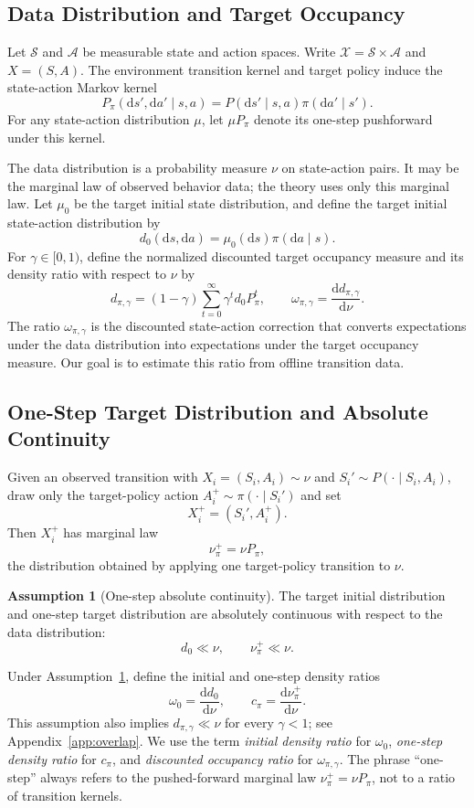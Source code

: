 \documentclass{article}
\newcommand{\sS}{\mathcal{S}}
\newcommand{\sA}{\mathcal{A}}
\newcommand{\sX}{\mathcal{X}}
\newcommand{\1}{\mathbf{1}}
\newcommand{\dd}{\mathrm{d}}
\newcommand{\nup}{\nu_\pi^+}
\newcommand{\cpi}{c_\pi}
\newcommand{\omegazero}{\omega_0}
\newcommand{\omegastar}{\omega_{\pi,\gamma}}
\newcommand{\Ppi}{P_\pi}
\newcommand{\dinit}{d_0}
\theoremstyle{plain}
\theoremstyle{definition}
\newtheorem{assumption}[theorem]{Assumption}
\theoremstyle{remark}
\begin{document}
\subsection{Data Distribution and Target Occupancy}

Let $\sS$ and $\sA$ be measurable state and action spaces. Write
$\sX=\sS\times\sA$ and $X=(S,A)$. The environment transition kernel and target
policy induce the state-action Markov kernel
\[
    \Ppi(\dd s',\dd a'\mid s,a)
    =
    P(\dd s'\mid s,a)\pi(\dd a'\mid s').
\]
For any state-action distribution $\mu$, let $\mu\Ppi$ denote its one-step
pushforward under this kernel.

The data distribution is a probability measure $\nu$ on state-action pairs. It
may be the marginal law of observed behavior data; the theory uses only this
marginal law. Let $\mu_0$ be the target initial state distribution, and define
the target initial state-action distribution by
\[
    \dinit(\dd s,\dd a)=\mu_0(\dd s)\pi(\dd a\mid s).
\]
For $\gamma\in[0,1)$, define the normalized discounted target occupancy measure
and its density ratio with respect to $\nu$ by
\[
    d_{\pi,\gamma}
    =
    (1-\gamma)\sum_{t=0}^{\infty}\gamma^t \dinit \Ppi^t,
    \qquad
    \omegastar=\frac{\dd d_{\pi,\gamma}}{\dd \nu}.
\]
The ratio $\omegastar$ is the discounted state-action correction that converts
expectations under the data distribution into expectations under the target
occupancy measure. Our goal is to estimate this ratio from offline transition
data.
\subsection{One-Step Target Distribution and Absolute Continuity}

Given an observed transition with $X_i=(S_i,A_i)\sim\nu$ and
$S_i'\sim P(\cdot\mid S_i,A_i)$, draw only the target-policy action
$A_i^+\sim\pi(\cdot\mid S_i')$ and set
\[
    X_i^+=(S_i',A_i^+).
\]
Then $X_i^+$ has marginal law
\[
    \nup=\nu\Ppi,
\]
the distribution obtained by applying one target-policy transition to $\nu$.

\begin{assumption}[One-step absolute continuity]
\label{ass:overlap}
The target initial distribution and one-step target distribution are absolutely
continuous with respect to the data distribution:
\[
    \dinit\ll\nu,
    \qquad
    \nup\ll\nu.
\]
\end{assumption}

Under Assumption~\ref{ass:overlap}, define the initial and one-step density
ratios
\[
    \omegazero=\frac{\dd\dinit}{\dd\nu},
    \qquad
    \cpi=\frac{\dd\nup}{\dd\nu}.
\]
This assumption also implies $d_{\pi,\gamma}\ll\nu$ for every $\gamma<1$; see
Appendix~\ref{app:overlap}. We use the term \emph{initial density ratio} for
$\omegazero$, \emph{one-step density ratio} for $\cpi$, and \emph{discounted
occupancy ratio} for $\omegastar$. The phrase ``one-step'' always refers to the
pushed-forward marginal law $\nup=\nu\Ppi$, not to a ratio of transition kernels.
\end{document}
